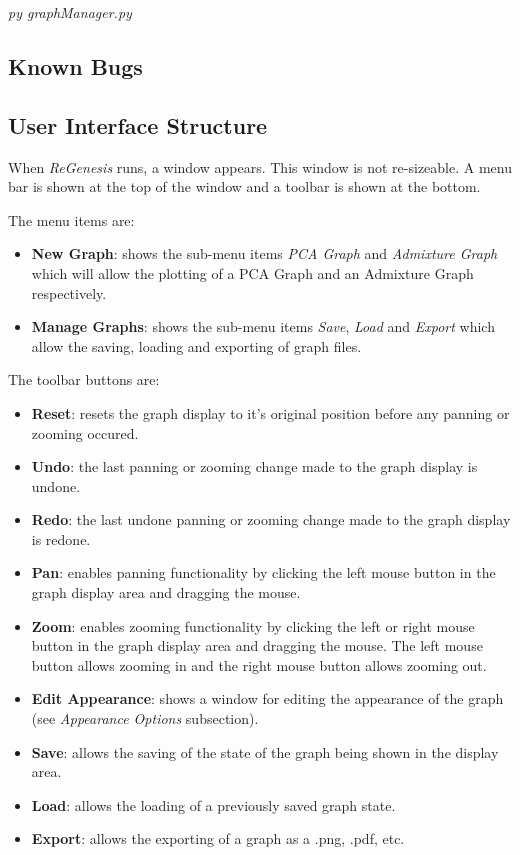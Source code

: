 \documentclass[11pt]{article}
\begin{document}
\textit{py graphManager.py}


\subsection{Known Bugs}

\subsection{User Interface Structure}
When \textit{ReGenesis} runs, a window appears. This window is not re-sizeable. A menu bar is shown at the top of the window and a toolbar is shown at the bottom. 

The menu items are:
\begin{itemize}
\item \textbf{New Graph}: shows the sub-menu items \textit{PCA Graph} and \textit{Admixture Graph} which will allow the plotting of a PCA Graph and an Admixture Graph respectively.
\item \textbf{Manage Graphs}: shows the sub-menu items \textit{Save}, \textit{Load} and \textit{Export} which allow the saving, loading and exporting of graph files.
\end{itemize}

The toolbar buttons are:
\begin{itemize}
\item \textbf{Reset}: resets the graph display to it's original position before any panning or zooming occured.
\item \textbf{Undo}: the last panning or zooming change made to the graph display is undone.
\item \textbf{Redo}: the last undone panning or zooming change made to the graph display is redone.
\item \textbf{Pan}: enables panning functionality by clicking the left mouse button in the graph display area and dragging the mouse.
\item \textbf{Zoom}: enables zooming functionality by clicking the left or right mouse button in the graph display area and dragging the mouse. The left mouse button allows zooming in and the right mouse button allows zooming out.
\item \textbf{Edit Appearance}: shows a window for editing the appearance of the graph (see \textit{Appearance Options} subsection).
\item \textbf{Save}: allows the saving of the state of the graph being shown in the display area.
\item \textbf{Load}: allows the loading of a previously saved graph state.
\item \textbf{Export}: allows the exporting of a graph as a .png, .pdf, etc.
\end{itemize}
\end{document}
